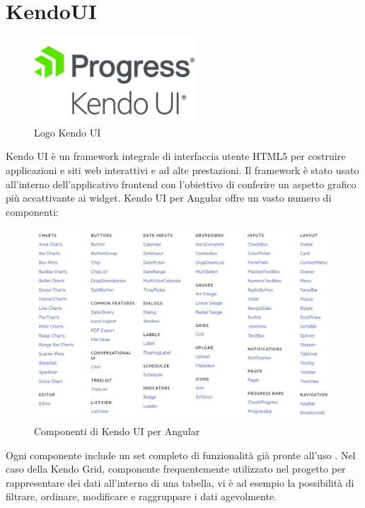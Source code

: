 \section{KendoUI}
\begin{figure}[ht!]
\begin{center}
  \includegraphics[width=6cm]{images/kendo_logo.png}
  \caption{Logo Kendo UI}
\end{center}
\end{figure}
Kendo UI è un framework integrale di interfaccia utente HTML5 per costruire applicazioni e siti web interattivi e ad alte prestazioni. \cite{KENDO}
Il framework è stato usato all'interno dell'applicativo frontend con l'obiettivo di conferire un aspetto grafico più accattivante ai widget. Kendo UI per Angular offre un vasto numero di componenti:
\begin{figure}[ht!]
\begin{center}
  \includegraphics[width=15cm]{images/kendo_components.JPG}
  \caption{Componenti di Kendo UI per Angular}
\end{center}
\end{figure}
Ogni componente include un set completo di funzionalità già pronte all'uso \cite{KENDO}. Nel caso della Kendo Grid, componente frequentemente utilizzato nel progetto per rappresentare dei dati all'interno di una tabella, vi è ad esempio la possibilità di filtrare, ordinare, modificare e raggruppare i dati agevolmente.
